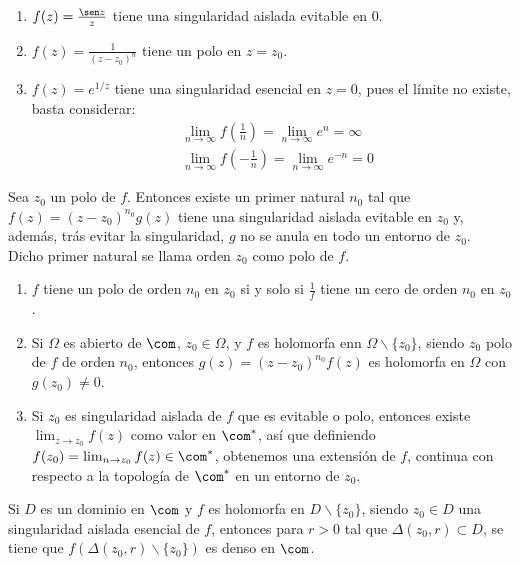 \begin{ejemplo}
\begin{enumerate}
    \item $f(z) = \frac{\sen z}{z}$ tiene una singularidad aislada evitable en $0$.
    \item $f(z) = \frac{1}{(z-z_0)^n}$ tiene un polo en $z = z_0$.
    \item $f(z) = e^{1/z}$ tiene una singularidad esencial en $z = 0$, pues el límite no existe, basta considerar:
    \begin{align*}
        &\lim_{n \to \infty} f\left( \frac{1}{n} \right) = \lim_{n \to \infty} e^n  = \infty \\
        &\lim_{n \to \infty} f\left(- \frac{1}{n} \right) = \lim_{n \to \infty} e^{-n}  = 0
\end{align*}
\end{enumerate}
\end{ejemplo}

\begin{teo}
Sea $z_0$ un polo de $f$. Entonces existe un primer natural $n_0$ tal que $f(z) = (z-z_0)^{n_0}g(z)$ tiene una singularidad aislada evitable en $z_0$ y, además, trás evitar la singularidad, $g$ no se anula en todo un entorno de $z_0$.
\\
\newline
Dicho primer natural se llama orden $z_0$ como polo de $f$.
\end{teo}

\begin{obs}
\begin{enumerate}
    \item $f$ tiene un polo de orden $n_0$ en $z_0$ si y solo si $\frac{1}{f}$ tiene un cero de orden $n_0$ en $z_0$.
    \item Si $\Omega$ es abierto de $\com$, $z_0 \in \Omega$, y $f$ es holomorfa enn $\Omega \backslash \{z_0\}$, siendo $z_0$ polo de $f$ de orden $n_0$, entonces $g(z) = (z-z_0)^{n_0}f(z)$ es holomorfa en $\Omega$ con $g(z_0) \not = 0$.
    \item Si $z_0$ es singularidad aislada de $f$ que es evitable o polo, entonces existe $\lim_{z \to z_0} f(z)$ como valor en $\com^*$, así que definiendo $f(z_0) = \lim_{n \to z_0} f(z) \in \com^*$, obtenemos una extensión de $f$, continua con respecto a la topología de $\com^*$ en un entorno de $z_0$.
\end{enumerate}
\end{obs}

\begin{teo}
Si $D$ es un dominio en $\com$ y $f$ es holomorfa en $D \backslash \{z_0\}$, siendo $z_0 \in D$ una singularidad aislada esencial de $f$, entonces para $r>0$ tal que $\Delta(z_0,r) \subset D$, se tiene que $f(\Delta(z_0,r) \backslash \{z_0\})$ es denso en $\com$.
\end{teo}

